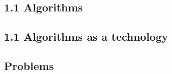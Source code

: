 
\subsection*{1.1 Algorithms}


\subsection*{1.1 Algorithms as a technology}


\subsection*{Problems}


